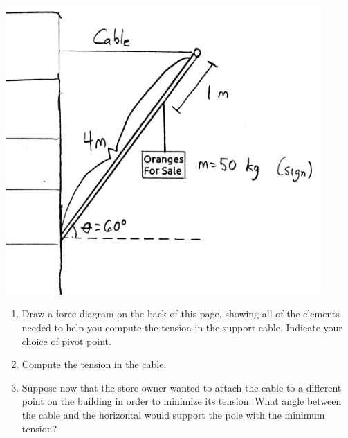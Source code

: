 \documentclass[12pt]{article}
\begin{document}
\begin{enumerate}
\begin{minipage}[b]{0.4\textwidth}
\bigskip
\bigskip
\bigskip
\bigskip
\bigskip
\bigskip

\end{minipage}
\begin{minipage}[t]{0.6\textwidth}
  \begin{flushright}
  \includegraphics[width=0.9\textwidth]{sign2.jpg}
\end{flushright}
\end{minipage}

\bigskip
\bigskip

\begin{enumerate}
\item Draw a force diagram on the back of this page, showing all of the elements needed to help you compute the tension in the support cable. Indicate
your choice of pivot point.

\bigskip

\item Compute the tension in the cable. 

\vspace{2 in}

\item Suppose now that the store owner wanted to attach the cable to a different point on the building in order to minimize its tension. What angle between the
cable and the horizontal would support the pole with the minimum tension?
\end{enumerate}
\newpage
\newpage


\end{enumerate}
\end{document}
